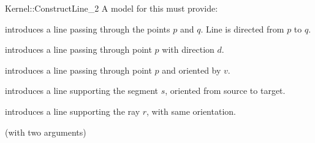 \begin{ccRefFunctionObjectConcept}{Kernel::ConstructLine_2}
A model for this must provide:


            {introduces a line  passing through the points $p$ and $q$. 
             Line  is directed from $p$ to $q$.}

            {introduces a line  passing through point $p$ with 
             direction $d$.}

            {introduces a line  passing through point $p$ and
             oriented by $v$.}

            {introduces a line  supporting the segment $s$,
            oriented from source to target.}

            {introduces a line  supporting the ray $r$,
            with same orientation.}

\ccRefines
{} (with two arguments)

\ccSeeAlso
{}  \\

\end{ccRefFunctionObjectConcept}
